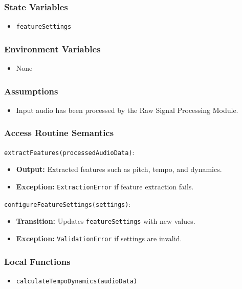 \documentclass[12pt, titlepage]{article}
\begin{document}
\subsubsection{State Variables}  
\begin{itemize}  
    \item \texttt{featureSettings}  
\end{itemize}  

\subsubsection{Environment Variables}  
\begin{itemize}  
    \item None  
\end{itemize}  

\subsubsection{Assumptions}  
\begin{itemize}  
    \item Input audio has been processed by the Raw Signal Processing Module.  
\end{itemize}  

\subsubsection{Access Routine Semantics}  

\noindent \texttt{extractFeatures(processedAudioData)}:
\begin{itemize}  
    \item \textbf{Output:} Extracted features such as pitch, tempo, and dynamics.  
    \item \textbf{Exception:} \texttt{ExtractionError} if feature extraction fails.  
\end{itemize}  

\noindent \texttt{configureFeatureSettings(settings)}:
\begin{itemize}  
    \item \textbf{Transition:} Updates \texttt{featureSettings} with new values.  
    \item \textbf{Exception:} \texttt{ValidationError} if settings are invalid.  
\end{itemize}  

\subsubsection{Local Functions}  
\begin{itemize}  
    \item \texttt{calculateTempoDynamics(audioData)}  
\end{itemize}  
\end{document}

